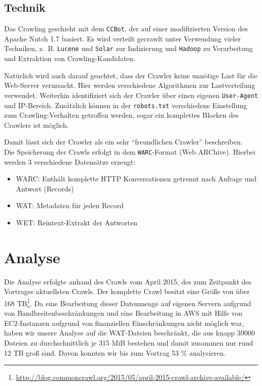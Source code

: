 \documentclass[a4paper,12pt,titlepage=false]{scrreprt}
\begin{document}
\section{Technik}

Das Crawling geschieht mit dem \texttt{CCBot}, der auf einer modifizierten Version des Apache Nutch 1.7 basiert.
Es wird verteilt gecrawlt unter Verwendung vieler Techniken, z.\ B. \texttt{Lucene} und \texttt{Solar} zur Indizierung und \texttt{Hadoop} zu Verarbeitung und Extraktion von Crawling-Kandidaten.

Natürlich wird auch darauf geachtet, dass der Crawler keine unnötige Last für die Web-Server verursacht.
Hier werden verschiedene Algorithmen zur Lastverteilung verwendet.
Weiterhin identifiziert sich der Crawler über einen eigenen \texttt{User-Agent} und IP-Bereich.
Zusätzlich können in der \texttt{robots.txt} verschiedene Einstellung zum Crawling-Verhalten getroffen werden, sogar ein komplettes Blocken des Crawlers ist möglich.

Damit lässt sich der Crawler als ein sehr ``freundlichen Crawler'' beschreiben.
\\

Die Speicherung der Crawls erfolgt in dem \texttt{WARC}-Format (Web ARChive).
Hierbei werden 3 verschiedene Datensätze erzeugt:

\begin{itemize}
    \item WARC: Enthält komplette HTTP Konversationen getrennt nach Anfrage und Antwort (Records)
    \item WAT: Metadaten für jeden Record
    \item WET: Reintext-Extrakt der Antworten
\end{itemize}


\chapter{Analyse}

Die Analyse erfolgte anhand des Crawls vom April 2015, des zum Zeitpunkt des
Vortrages aktuellsten Crawls. Der komplette Crawl besitzt eine Größe von über
168 TB\footnote{\url{http://blog.commoncrawl.org/2015/05/april-2015-crawl-archive-available/}}.
Da eine Bearbeitung dieser Datenmenge auf eigenen Servern aufgrund von
Bandbreitenbeschränkungen und eine Bearbeitung in AWS mit Hilfe von EC2-Instanzen
aufgrund von finanziellen Einschränkungen nicht möglich war, haben wir unsere
Analyse auf die WAT-Dateien beschränkt, die aus knapp 39000 Dateien zu
durchschnittlich je 315 MiB bestehen und damit zusammen nur rund 12 TB groß sind.
Davon konnten wir bis zum Vortrag 53 \% analysieren.
\end{document}
